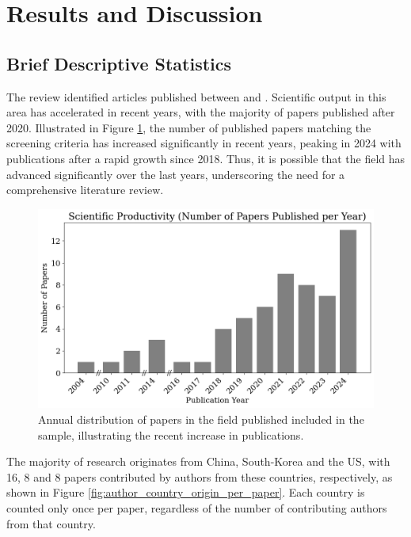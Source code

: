 \section{Results and Discussion}
\label{sec:result_and_discussion}


\subsection{Brief Descriptive Statistics}
The review identified \samplesize articles published between \samplestart and \sampleend. Scientific output in this area has accelerated in recent years, with the majority of papers published after 2020. Illustrated in Figure \ref{fig:scientific_productivity}, the number of published papers matching the screening criteria has increased significantly in recent years, peaking in 2024 with \articlesthisyear publications after a rapid growth since 2018. Thus, it is possible that the field has advanced significantly over the last years, underscoring the need for a comprehensive literature review.

\begin{figure}[H]
    \centering
    \includegraphics[width=1\linewidth]{Images/scientific_productivity.png}
    \caption{Annual distribution of papers in the field published included in the sample, illustrating the recent increase in publications.}
    \label{fig:scientific_productivity}
\end{figure}

The majority of research originates from China, South-Korea and the US, with 16, 8 and 8 papers contributed by authors from these countries, respectively, as shown in Figure \ref{fig:author_country_origin_per_paper}. Each country is counted only once per paper, regardless of the number of contributing authors from that country.  

